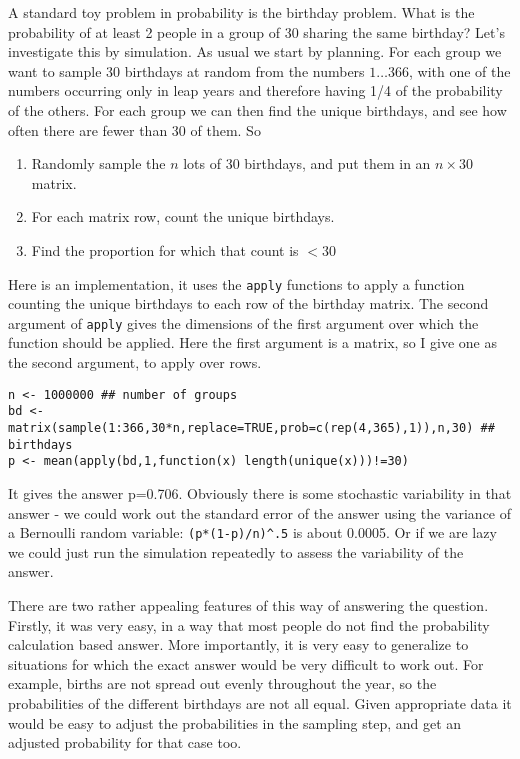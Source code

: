 \documentclass[10pt] {article}
\theoremstyle{definition}
\begin{document}
A standard toy problem in probability is the birthday problem. What is the probability of at least 2 people in a group of 30 sharing the same birthday? Let's investigate this by simulation. As usual we start by planning. For each group we want to sample 30 birthdays at random from the numbers $1 \ldots 366$, with one of the numbers occurring only in leap years and therefore having 1/4 of the probability of the others. For each group we can then find the unique birthdays, and see how often there are fewer than 30 of them. So  
\begin{enumerate}
\item Randomly sample the $n $ lots of 30 birthdays, and put them in an $n \times 30 $ matrix.
\item For each matrix row, count the unique birthdays.
\item Find the proportion for which that count is $<30$ 
\end{enumerate} 
Here is an implementation, it uses the {\tt apply} functions to apply a function counting the unique birthdays to each row of the birthday matrix. The second argument of {\tt apply} gives the dimensions of the first argument over which the function should be applied. Here the first argument is a matrix, so I give one as the second argument, to apply over rows.
\begin{lstlisting}
n <- 1000000 ## number of groups
bd <- matrix(sample(1:366,30*n,replace=TRUE,prob=c(rep(4,365),1)),n,30) ## birthdays
p <- mean(apply(bd,1,function(x) length(unique(x)))!=30)
\end{lstlisting}
It gives the answer p=0.706. Obviously there is some stochastic variability in that answer - we could work out the standard error of the answer using the variance of a Bernoulli random variable: \lstinline+(p*(1-p)/n)^.5+ is about 0.0005. Or if we are lazy we could just run the simulation repeatedly to assess the variability of the answer. 

There are two rather appealing features of this way of answering the question. Firstly, it was very easy, in a way that most people do not find the probability calculation based answer. More importantly, it is very easy to generalize to situations for which the exact answer would be very difficult to work out. For example, births are not spread out evenly throughout the year, so the probabilities of the different birthdays are not all equal. Given appropriate data it would be easy to adjust the probabilities in the sampling step, and get an adjusted probability for that case too.  
\end{document}
